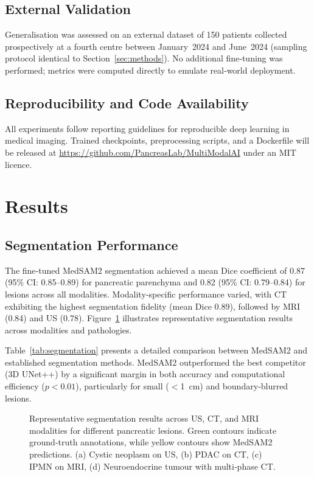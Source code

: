 \documentclass[a4paper, fleqn]{cas-dc}
\begin{document}
    \subsection{External Validation}
    Generalisation was assessed on an external dataset of 150 patients collected
    prospectively at a fourth centre between January~2024 and June~2024 (sampling
    protocol identical to Section~\ref{sec:methods}). No additional fine‑tuning
    was performed; metrics were computed directly to emulate real‑world deployment.

    \subsection{Reproducibility and Code Availability}
    All experiments follow reporting guidelines for reproducible deep learning in
    medical imaging. Trained checkpoints, preprocessing scripts, and a
    Dockerfile will be released at
    \url{https://github.com/PancreasLab/MultiModalAI} under an MIT licence.

    \section{Results}
    \label{sec:results}

    \subsection{Segmentation Performance}
    The fine‐tuned MedSAM2 segmentation achieved a mean Dice coefficient of 0.87
    (95\% CI: 0.85–0.89) for pancreatic parenchyma and 0.82 (95\% CI: 0.79–0.84)
    for lesions across all modalities. Modality‐specific performance varied, with
    CT exhibiting the highest segmentation fidelity (mean Dice 0.89), followed
    by MRI (0.84) and US (0.78). Figure~\ref{fig:segmentation} illustrates representative
    segmentation results across modalities and pathologies.

    Table~\ref{tab:segmentation} presents a detailed comparison between MedSAM2 and
    established segmentation methods. MedSAM2 outperformed the best competitor (3D
    UNet++) by a significant margin in both accuracy and computational
    efficiency ($p<0.01$), particularly for small ($<$\SI{1}{\centi\metre}) and
    boundary‐blurred lesions.

    \begin{figure}[htbp]
        \centering
        \caption{Representative segmentation results across US, CT, and MRI
        modalities for different pancreatic lesions. Green contours indicate ground‐truth
        annotations, while yellow contours show MedSAM2 predictions. (a) Cystic neoplasm
        on US, (b) PDAC on CT, (c) IPMN on MRI, (d) Neuroendocrine tumour with
        multi‐phase CT.}
        \label{fig:segmentation}
    \end{figure}
\end{document}

